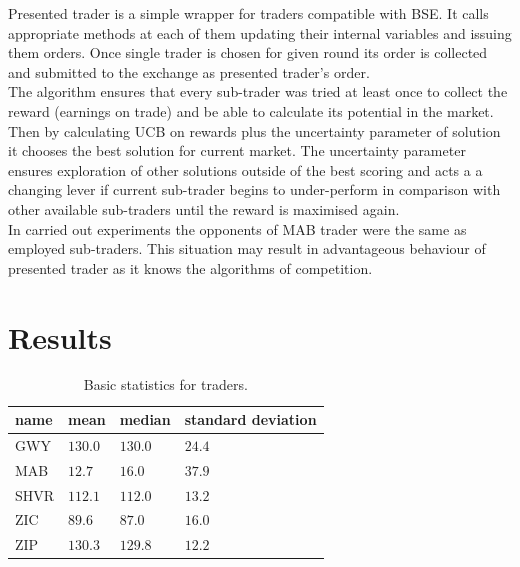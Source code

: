 \documentclass{llncs}
\begin{document}
Presented trader is a simple wrapper for traders compatible with BSE. It calls appropriate methods at each of them updating their internal variables and issuing them orders. Once single trader is chosen for given round its order is collected and submitted to the exchange as presented trader's order.\\
The algorithm ensures that every sub-trader was tried at least once to collect the reward (earnings on trade) and be able to calculate its potential in the market. Then by calculating UCB on rewards plus the uncertainty parameter of solution it chooses the best solution for current market. The uncertainty parameter ensures exploration of other solutions outside of the best scoring and acts a a changing lever if current sub-trader begins to under-perform in comparison with other available sub-traders until the reward is maximised again.\\

In carried out experiments the opponents of MAB trader were the same as employed sub-traders. This situation may result in advantageous behaviour of presented trader as it knows the algorithms of competition.

\section{Results}

\begin{table}[ht]
  \centering
  \begin{tabular}{ p{5em} | p{5em}  p{5em}  p{5em} }
    name & mean & median & standard deviation \\
    \hline
    GWY  & $130.0$ &$ 130.0$ &$ 24.4$ \\
    MAB  & $12.7 $& $16.0 $& $37.9$ \\
    SHVR & $112.1$& $112.0 $& $13.2$\\
    ZIC  & $89.6 $& $87.0 $& $16.0$\\
    ZIP  & $130.3$ &$ 129.8$ & $12.2$
  \end{tabular}
  \vspace*{1em}
  \caption{Basic statistics for traders.\label{tab:stats}}
\end{table}
\end{document}
